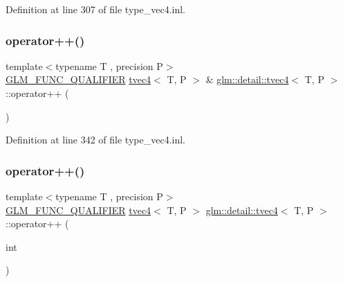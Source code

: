 Definition at line 307 of file type\+\_\+vec4.\+inl.

\mbox{\label{structglm_1_1detail_1_1tvec4_aaa93930bcde2580185a474e508508ed2}} 
\subsubsection{\texorpdfstring{operator++()}{operator++()}\hspace{0.1cm}{\footnotesize\ttfamily [1/2]}}
{\footnotesize\ttfamily template$<$typename T , precision P$>$ \\
\hyperlink{setup_8hpp_a33fdea6f91c5f834105f7415e2a64407}{G\+L\+M\+\_\+\+F\+U\+N\+C\+\_\+\+Q\+U\+A\+L\+I\+F\+I\+ER} \hyperlink{structglm_1_1detail_1_1tvec4}{tvec4}$<$ T, P $>$ \& \hyperlink{structglm_1_1detail_1_1tvec4}{glm\+::detail\+::tvec4}$<$ T, P $>$\+::operator++ (\begin{DoxyParamCaption}{ }\end{DoxyParamCaption})}



Definition at line 342 of file type\+\_\+vec4.\+inl.

\mbox{\label{structglm_1_1detail_1_1tvec4_a60d572f73f76dbdedd6b1a164f8aacaa}} 
\subsubsection{\texorpdfstring{operator++()}{operator++()}\hspace{0.1cm}{\footnotesize\ttfamily [2/2]}}
{\footnotesize\ttfamily template$<$typename T , precision P$>$ \\
\hyperlink{setup_8hpp_a33fdea6f91c5f834105f7415e2a64407}{G\+L\+M\+\_\+\+F\+U\+N\+C\+\_\+\+Q\+U\+A\+L\+I\+F\+I\+ER} \hyperlink{structglm_1_1detail_1_1tvec4}{tvec4}$<$ T, P $>$ \hyperlink{structglm_1_1detail_1_1tvec4}{glm\+::detail\+::tvec4}$<$ T, P $>$\+::operator++ (\begin{DoxyParamCaption}\item[{int}]{ }\end{DoxyParamCaption})}



